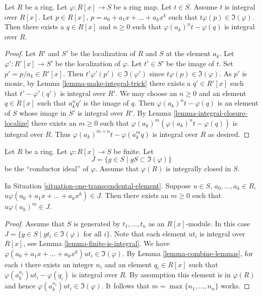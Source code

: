 \begin{lemma}
\label{lemma-combine-lemmas}
Let $R$ be a ring. Let $\varphi : R[x] \to S$ be
a ring map. Let $t \in S$. Assume $t$ is integral
over $R[x]$. Let $p \in R[x]$, $p = a_0 + a_1x + \ldots +
a_k x^k$ such that $t \varphi(p) \in \Im(\varphi)$.
Then there exists a $q \in R[x]$ and $n \geq 0$
such that $\varphi(a_k)^n t - \varphi(q)$ is integral
over $R$.
\end{lemma}

\begin{proof}
Let $R'$ and $S'$ be the localization of $R$ and $S$ at the element $a_k$.
Let $\varphi' : R'[x] \to S'$ be the localization of $\varphi$.
Let $t' \in S'$ be the image of $t$. Set $p' = p/a_k \in R'[x]$.
Then $t' \varphi'(p') \in \Im(\varphi')$ since $t \varphi(p) \in \Im(\varphi)$.
As $p'$ is monic, by
Lemma \ref{lemma-make-integral-trick} there exists a $q' \in R'[x]$
such that $t' - \varphi'(q')$ is integral over $R'$.
We may choose an $n \geq 0$ and an element $q \in R[x]$
such that $a_k^n q'$ is the image of $q$.
Then $\varphi(a_k)^n t - \varphi(q)$ is an element of $S$ whose
image in $S'$ is integral over $R'$.
By Lemma \ref{lemma-integral-closure-localize}
there exists an $m \geq 0$ such that
$\varphi(a_k)^m(\varphi(a_k)^n t - \varphi(q))$ is integral over $R$.
Thus $\varphi(a_k)^{m + n}t - \varphi(a_k^m q)$
is integral over $R$ as desired.
\end{proof}

\begin{situation}
\label{situation-one-transcendental-element}
Let $R$ be a ring.
Let $\varphi : R[x] \to S$ be finite.
Let
$$
J = \{ g \in S \mid gS \subset \Im(\varphi)\}
$$
be the ``conductor ideal'' of $\varphi$.
Assume that $\varphi(R)$ is integrally closed in $S$.
\end{situation}

\begin{lemma}
\label{lemma-leading-coefficient-in-J}
In Situation \ref{situation-one-transcendental-element}.
Suppose $u \in S$, $a_0, \ldots, a_k \in R$,
$u \varphi(a_0 + a_1x + \ldots + a_k x^k) \in J$.
Then there exists an $m \geq 0$ such that
$u \varphi(a_k)^m \in J$.
\end{lemma}

\begin{proof}
Assume that $S$ is generated by $t_1, \ldots, t_n$
as an $R[x]$-module. In this case
$J = \{ g \in S \mid gt_i \in \Im(\varphi)\text{ for all }i\}$.
Note that each element $u t_i$ is integral over
$R[x]$, see Lemma \ref{lemma-finite-is-integral}.
We have $\varphi(a_0 + a_1x + \ldots + a_k x^k) u t_i \in
\Im(\varphi)$. By Lemma \ref{lemma-combine-lemmas}, for
each $i$ there exists an integer $n_i$ and an element
$q_i \in R[x]$ such that $\varphi(a_k^{n_i}) u t_i - \varphi(q_i)$
is integral over $R$. By assumption this element is in $\varphi(R)$
and hence $\varphi(a_k^{n_i}) u t_i \in \Im(\varphi)$.
It follows that $m = \max\{n_1, \ldots, n_n\}$ works.
\end{proof}

